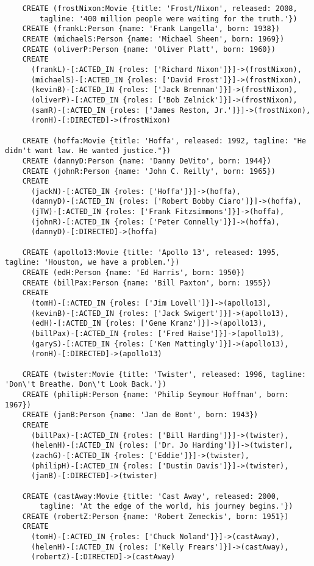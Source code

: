 \begin{lstlisting}
	CREATE (frostNixon:Movie {title: 'Frost/Nixon', released: 2008,
	    tagline: '400 million people were waiting for the truth.'})
	CREATE (frankL:Person {name: 'Frank Langella', born: 1938})
	CREATE (michaelS:Person {name: 'Michael Sheen', born: 1969})
	CREATE (oliverP:Person {name: 'Oliver Platt', born: 1960})
	CREATE
	  (frankL)-[:ACTED_IN {roles: ['Richard Nixon']}]->(frostNixon),
	  (michaelS)-[:ACTED_IN {roles: ['David Frost']}]->(frostNixon),
	  (kevinB)-[:ACTED_IN {roles: ['Jack Brennan']}]->(frostNixon),
	  (oliverP)-[:ACTED_IN {roles: ['Bob Zelnick']}]->(frostNixon),
	  (samR)-[:ACTED_IN {roles: ['James Reston, Jr.']}]->(frostNixon),
	  (ronH)-[:DIRECTED]->(frostNixon)
	
	CREATE (hoffa:Movie {title: 'Hoffa', released: 1992, tagline: "He didn't want law. He wanted justice."})
	CREATE (dannyD:Person {name: 'Danny DeVito', born: 1944})
	CREATE (johnR:Person {name: 'John C. Reilly', born: 1965})
	CREATE
	  (jackN)-[:ACTED_IN {roles: ['Hoffa']}]->(hoffa),
	  (dannyD)-[:ACTED_IN {roles: ['Robert Bobby Ciaro']}]->(hoffa),
	  (jTW)-[:ACTED_IN {roles: ['Frank Fitzsimmons']}]->(hoffa),
	  (johnR)-[:ACTED_IN {roles: ['Peter Connelly']}]->(hoffa),
	  (dannyD)-[:DIRECTED]->(hoffa)
	
	CREATE (apollo13:Movie {title: 'Apollo 13', released: 1995, tagline: 'Houston, we have a problem.'})
	CREATE (edH:Person {name: 'Ed Harris', born: 1950})
	CREATE (billPax:Person {name: 'Bill Paxton', born: 1955})
	CREATE
	  (tomH)-[:ACTED_IN {roles: ['Jim Lovell']}]->(apollo13),
	  (kevinB)-[:ACTED_IN {roles: ['Jack Swigert']}]->(apollo13),
	  (edH)-[:ACTED_IN {roles: ['Gene Kranz']}]->(apollo13),
	  (billPax)-[:ACTED_IN {roles: ['Fred Haise']}]->(apollo13),
	  (garyS)-[:ACTED_IN {roles: ['Ken Mattingly']}]->(apollo13),
	  (ronH)-[:DIRECTED]->(apollo13)
	
	CREATE (twister:Movie {title: 'Twister', released: 1996, tagline: 'Don\'t Breathe. Don\'t Look Back.'})
	CREATE (philipH:Person {name: 'Philip Seymour Hoffman', born: 1967})
	CREATE (janB:Person {name: 'Jan de Bont', born: 1943})
	CREATE
	  (billPax)-[:ACTED_IN {roles: ['Bill Harding']}]->(twister),
	  (helenH)-[:ACTED_IN {roles: ['Dr. Jo Harding']}]->(twister),
	  (zachG)-[:ACTED_IN {roles: ['Eddie']}]->(twister),
	  (philipH)-[:ACTED_IN {roles: ['Dustin Davis']}]->(twister),
	  (janB)-[:DIRECTED]->(twister)
	
	CREATE (castAway:Movie {title: 'Cast Away', released: 2000,
	    tagline: 'At the edge of the world, his journey begins.'})
	CREATE (robertZ:Person {name: 'Robert Zemeckis', born: 1951})
	CREATE
	  (tomH)-[:ACTED_IN {roles: ['Chuck Noland']}]->(castAway),
	  (helenH)-[:ACTED_IN {roles: ['Kelly Frears']}]->(castAway),
	  (robertZ)-[:DIRECTED]->(castAway)
	

\end{lstlisting}

